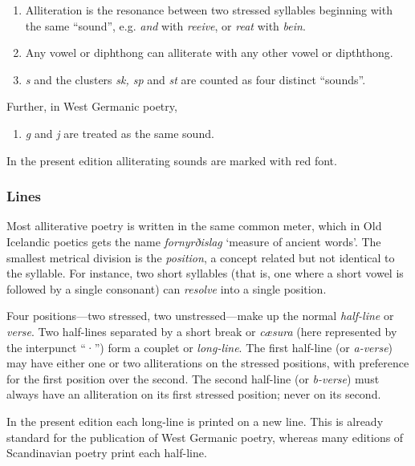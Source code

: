     \begin{enumerate}
      \item Alliteration is the resonance between two stressed syllables beginning with the same “sound”, e.g. \emph{and} with \emph{reeive}, or \emph{reat} with \emph{bein}.
      \item Any vowel or diphthong can alliterate with any other vowel or dipththong.
      \item \emph{s} and the clusters \emph{sk, sp} and \emph{st} are counted as four distinct “sounds”.
    \end{enumerate}

    Further, in West Germanic poetry,

    \begin{enumerate}[4.]
      \item \emph{g} and \emph{j} are treated as the same sound.
    \end{enumerate}

    In the present edition alliterating sounds are marked with red font.

    \subsubsection{Lines}
    Most alliterative poetry is written in the same common meter, which in Old Icelandic poetics gets the name \emph{fornyrðislag} ‘measure of ancient words’.  The smallest metrical division is the \emph{position}, a concept related but not identical to the syllable.  For instance, two short syllables (that is, one where a short vowel is followed by a single consonant) can \emph{resolve} into a single position.

    Four positions—two stressed, two unstressed—make up the normal \emph{half-line} or \emph{verse}.  Two half-lines separated by a short break or \emph{cæsura} (here represented by the interpunct “·”) form a couplet or \emph{long-line}.  The first half-line (or \emph{a-verse}) may have either one or two alliterations on the stressed positions, with preference for the first position over the second.  The second half-line (or \emph{b-verse}) must always have an alliteration on its first stressed position; never on its second.

    In the present edition each long-line is printed on a new line.  This is already standard for the publication of West Germanic poetry, whereas many editions of Scandinavian poetry print each half-line.

